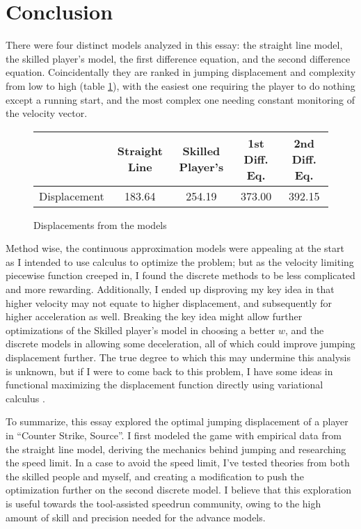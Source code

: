 

\section{Conclusion}
There were four distinct models analyzed in this essay: the straight line model, the skilled player's model, the first difference equation, and the second difference equation. Coincidentally they are ranked in jumping displacement and complexity from low to high (table \ref{tbl:dis}), with the easiest one requiring the player to do nothing except a running start, and the most complex one needing constant monitoring of the velocity vector.

\begin{figure}[H]
    \centering
    \begin{tabular}{|c|c|c|c|c|}
        \hline
        & Straight Line & Skilled Player's & 1st Diff. Eq. & 2nd Diff. Eq.\\
        \hline
        Displacement & 183.64  & 254.19 & 373.00 & 392.15 \\
        \hline
    \end{tabular}
    \caption{Displacements from the models}
    \label{tbl:dis}
\end{figure}

Method wise, the continuous approximation models were appealing at the start as I intended to use calculus to optimize the problem; but as the velocity limiting piecewise function creeped in, I found the discrete methods to be less complicated and more rewarding. Additionally, I ended up disproving my key idea in that higher velocity may not equate to higher displacement, and subsequently for higher acceleration as well. Breaking the key idea might allow further optimizations of the Skilled player's model in choosing a better $w$, and the discrete models in allowing some deceleration, all of which could improve jumping displacement further. The true degree to which this may undermine this analysis is unknown, but if I were to come back to this problem, I have some ideas in functional maximizing the displacement function directly using variational calculus .

To summarize, this essay explored the optimal jumping displacement of a player in ``Counter Strike, Source''. I first modeled the game with empirical data from the straight line model, deriving the mechanics behind jumping and researching the speed limit. In a case to avoid the speed limit, I've tested theories from both the skilled people and myself, and creating a modification to push the optimization further on the second discrete model. I believe that this exploration is useful towards the tool-assisted speedrun community, owing to the high amount of skill and precision needed for the advance models.

